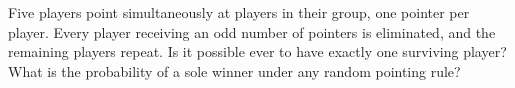 Five players point simultaneously at players in their group, one pointer per player. Every player receiving an odd number of pointers is eliminated, and the remaining players repeat. Is it possible ever to have exactly one surviving player? What is the probability of a sole winner under any random pointing rule?
